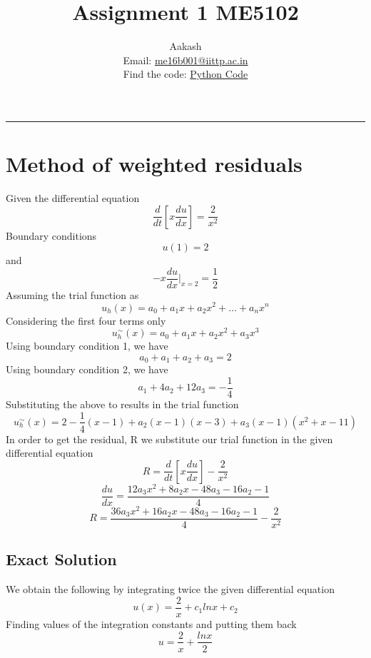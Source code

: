 \documentclass[11pt]{article}
\title{Assignment 1 ME5102}
\author{Aakash \\ Email: \href{mailto:me16b001@iittp.ac.in}{me16b001@iittp.ac.in} \\ Find the code: \href{https://drive.google.com/open?id=1D1zNA7em90M0C5I0VxXinQPLjyuoyLw1}{ Python Code} }
\begin{document}
    
    
    \maketitle
    
    

    
    \begin{center}\rule{0.5\linewidth}{\linethickness}\end{center}

\section*{Method of weighted
residuals}\label{method-of-weighted-residuals}

Given the differential equation
\[ \frac{d}{dt}\left[x\frac{du}{dx}\right] = \frac{2}{x^2}\] Boundary
conditions \[u(1)=2\] and \[-x\frac{du}{dx}\Biggr|_{x=2} = \frac{1}{2}\]
Assuming the trial function as
\[ u_{h}(x)=a_{0}+a_{1}x+a_{2}x^{2}+\dots +a_{n}x^{n} \] Considering the
first four terms only
\[ u^\sim_{h}(x)=a_{0}+a_{1}x+a_{2}x^{2}+a_{3}x^{3} \] Using boundary
condition 1, we have \[a_{0}+a_{1}+a_{2}+a_{3}=2\] Using boundary
condition 2, we have \[a_{1}+4a_{2}+12a_{3} = -\frac{1}{4}\]
Substituting the above to results in the trial function
\[u^\sim_{h}(x)=2 - \frac{1}{4}(x-1)+a_{2}(x-1)(x-3)+a_{3}(x-1)(x^2+x-11)\]
In order to get the residual, R we substitute our trial function in the
given differential equation
\[ R = \frac{d}{dt}\left[x\frac{du}{dx}\right] - \frac{2}{x^2}\]
\[ \frac{du}{dx} = \dfrac{12 a_3 x^2+8a_2x-48a_3-16a_2-1}{4}\]
\[ R = \dfrac{36 a_3x^2+16a_2x-48a_3-16a_2-1}{4} - \frac{2}{x^2}\]

\subsection*{Exact Solution}\label{exact-solution}

We obtain the following by integrating twice the given differential
equation \[ u(x) = \frac{2}{x}+c_1lnx+c_2\] Finding values of the
integration constants and putting them back
\[ u = \frac{2}{x}+\frac{lnx}{2}\]
\end{document}
